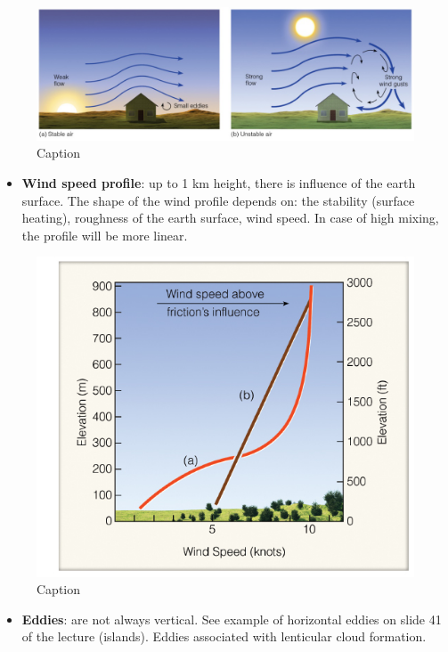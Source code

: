 \documentclass[12pt,oneside]{book}
\providecommand{\tightlist}{%
  \setlength{\itemsep}{0pt}\setlength{\parskip}{0pt}}
\begin{document}
\begin{figure}

{\centering \includegraphics[width=0.8\linewidth]{figures/Figure418} 

}

\caption{Caption}\label{fig:Thermal}
\end{figure}

\begin{itemize}
\tightlist
\item
  \textbf{Wind speed profile}: up to 1 km height, there is influence of
  the earth surface. The shape of the wind profile depends on: the
  stability (surface heating), roughness of the earth surface, wind
  speed. In case of high mixing, the profile will be more linear.
\end{itemize}

\begin{figure}

{\centering \includegraphics[width=0.8\linewidth]{figures/Figure419} 

}

\caption{Caption}\label{fig:Profile}
\end{figure}

\begin{itemize}
\tightlist
\item
  \textbf{Eddies}: are not always vertical. See example of horizontal
  eddies on slide 41 of the lecture (islands). Eddies associated with
  lenticular cloud formation.
\end{itemize}
\end{document}
